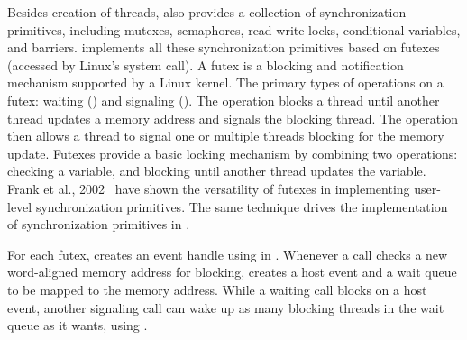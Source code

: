 Besides creation of threads, \libpthread{} also provides a collection of synchronization primitives, including mutexes, semaphores, read-write locks, conditional variables, and barriers.
\libpthread{} implements all these synchronization primitives based on futexes (accessed by Linux's  system call). %
A futex is a blocking and notification mechanism
supported by a Linux kernel.
The primary types of operations on a futex: 
waiting () and signaling ().
The  operation
blocks a thread until another thread updates a memory address
and signals the blocking thread.
The  operation then allows a thread
to signal one or multiple threads blocking for the memory update.
Futexes provide a basic locking mechanism
by combining two operations: checking a variable, and blocking until
another thread updates the variable.
Frank et al., 2002~\cite{franke02futex} have shown the versatility of futexes
in implementing user-level synchronization primitives. The same technique drives the implementation of synchronization primitives in \libpthread{}.


For each futex, \thelibos{} creates an event handle using  in \thehostabi{}.
Whenever a  call checks a new word-aligned memory address for blocking, \thelibos{} creates a host event and a wait queue to be mapped to the memory address.
While a waiting  call blocks on a host event,
another signaling  call can wake up as many blocking threads in the wait queue as it wants, using .



